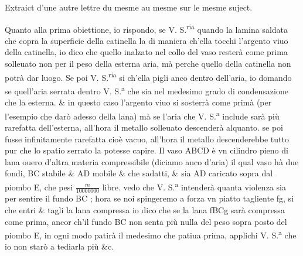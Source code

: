 \documentclass[11pt,a4paper]{article}
\begin{document}

Extraict d'une autre lettre du mesme au mesme sur le mesme suject.

Quanto alla prima obiettione, io rispondo, se V. S.\textsuperscript{ria} quando  la lamina saldata che copra la superficie della catinella la  di maniera ch'ella tocchi l'argento viuo della catinella, io dico che quello inalzato nel collo del vaso resterà come prima solleuato non per il peso della esterna aria, mà perche quello della catinella non potrà dar luogo. Se poi V. S.\textsuperscript{ria}  si ch'ella pigli anco dentro dell'aria, io domando se quell'aria serrata dentro V. S.\textsuperscript{a} che sia nel medesimo grado di condensazione che la esterna. \& in questo caso l'argento viuo si sosterrà come primà (per l'esempio che darò adesso della lana) mà se l'aria che V. S.\textsuperscript{a} include sarà più rarefatta dell'esterna, all'hora il metallo solleuato descenderà alquanto. se poi fusse infinitamente rarefatta cioè vacuo, all'hora il metallo descenderebbe tutto pur che lo spatio serrato la potesse capire. Il vaso ABCD è vn cilindro pieno di lana ouero d'altra materia compressibile (diciamo anco d'aria) il qual vaso hà due fondi, BC stabile \&  AD mobile \& che sadatti, \& sia AD caricato sopra dal piombo E, che pesi $\frac{m}{10000000}$ libre. vedo che V. S.\textsuperscript{a} intenderà quanta violenza sia per sentire il fundo BC ; hora se noi spingeremo a forza vn piatto tagliente fg, si che entri \& tagli la lana compressa io dico che se la lana fBCg sarà compressa come prima, ancor ch'il fundo BC non senta più nulla del peso sopra posto del piombo E, in ogni modo patirà il medesimo che patiua prima, applichi V. S.\textsuperscript{a} che io non starò a tediarla più \&c.

\end{document}
